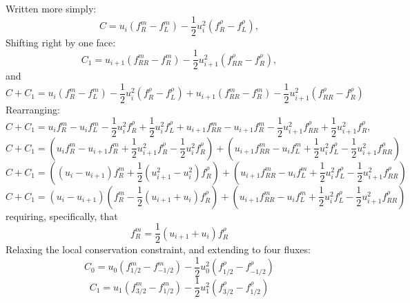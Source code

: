 \documentclass[12pt]{article}
\numberwithin{equation}{section}
\numberwithin{figure}{section}
\begin{document}
Written more simply:
\begin{equation}
C = u_i\left(f_{R}^{m} - f_{L}^{m}\right) - \frac{1}{2}u_i^2\left(f_{R}^\rho - f_{L}^\rho\right),
\end{equation}
Shifting right by one face:
\begin{equation}
C_1 = u_{i+1}\left(f_{RR}^{m} - f_{R}^{m}\right) - \frac{1}{2}u_{i+1}^2\left(f_{RR}^\rho - f_{R}^\rho\right),
\end{equation}
and
\begin{equation}
C + C_1 = u_i\left(f_{R}^{m} - f_{L}^{m}\right) - \frac{1}{2}u_i^2\left(f_{R}^\rho - f_{L}^\rho\right) + u_{i+1}\left(f_{RR}^{m} - f_{R}^{m}\right) - \frac{1}{2}u_{i+1}^2\left(f_{RR}^\rho - f_{R}^\rho\right)
\end{equation}
Rearranging:
\begin{equation}
C + C_1
= u_if_{R}^{m} - u_if_{L}^{m} - \frac{1}{2}u_i^2f_{R}^\rho + \frac{1}{2}u_i^2f_{L}^\rho
+ u_{i+1}f_{RR}^{m} - u_{i+1}f_{R}^{m} - \frac{1}{2}u_{i+1}^2f_{RR}^\rho + \frac{1}{2}u_{i+1}^2f_{R}^\rho,
\end{equation}
\begin{equation}
C + C_1
= \left(u_if_{R}^{m} - u_{i+1}f_{R}^{m} + \frac{1}{2}u_{i+1}^2f_{R}^\rho - \frac{1}{2}u_i^2f_{R}^\rho\right)
+ \left(u_{i+1}f_{RR}^{m} - u_if_{L}^{m} + \frac{1}{2}u_i^2f_{L}^\rho - \frac{1}{2}u_{i+1}^2f_{RR}^\rho\right)
\end{equation}
\begin{equation}
C + C_1
= \left((u_i- u_{i+1})f_{R}^{m} + \frac{1}{2}(u_{i+1}^2 - u_i^2)f_{R}^\rho\right)
+ \left(u_{i+1}f_{RR}^{m} - u_if_{L}^{m} + \frac{1}{2}u_i^2f_{L}^\rho - \frac{1}{2}u_{i+1}^2f_{RR}^\rho\right)
\end{equation}
\begin{equation}
C + C_1
= (u_i- u_{i+1})\left(f_{R}^{m} - \frac{1}{2}(u_{i+1} + u_i)f_{R}^\rho\right)
+ \left(u_{i+1}f_{RR}^{m} - u_if_{L}^{m} + \frac{1}{2}u_i^2f_{L}^\rho - \frac{1}{2}u_{i+1}^2f_{RR}^\rho\right)
\end{equation}
requiring, specifically, that
\begin{equation}
f_{R}^{m} = \frac{1}{2}(u_{i+1} + u_i)f_{R}^\rho
\end{equation}
Relaxing the local conservation constraint, and extending to four fluxes:
\begin{equation}
C_0 = u_0\left(f_{1/2}^{m} - f_{-1/2}^{m}\right) - \frac{1}{2}u_0^2\left(f_{1/2}^\rho - f_{-1/2}^\rho\right)
\end{equation}
\begin{equation}
C_1 = u_1\left(f_{3/2}^{m} - f_{1/2}^{m}\right) - \frac{1}{2}u_1^2\left(f_{3/2}^\rho - f_{1/2}^\rho\right)
\end{equation}
\end{document}
